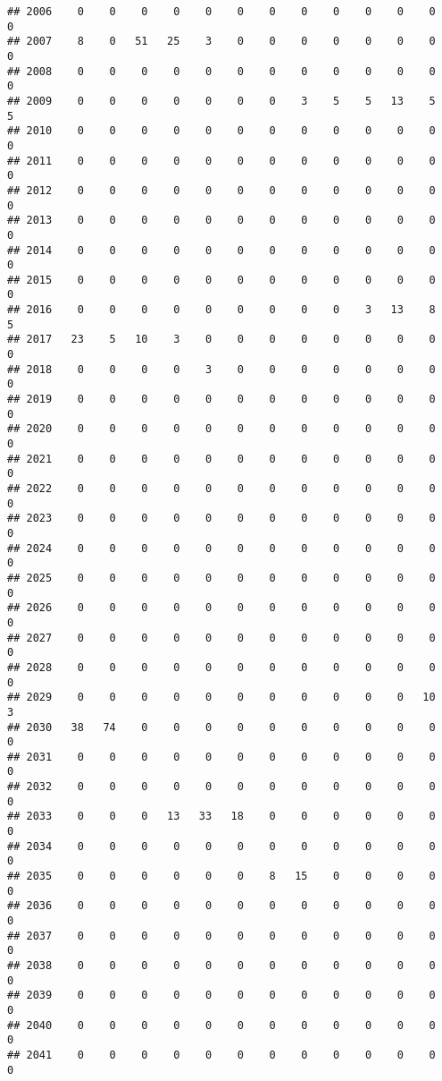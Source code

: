 \documentclass[]{article}
\begin{document}
\begin{verbatim}
## 2006    0    0    0    0    0    0    0    0    0    0    0    0    0
## 2007    8    0   51   25    3    0    0    0    0    0    0    0    0
## 2008    0    0    0    0    0    0    0    0    0    0    0    0    0
## 2009    0    0    0    0    0    0    0    3    5    5   13    5    5
## 2010    0    0    0    0    0    0    0    0    0    0    0    0    0
## 2011    0    0    0    0    0    0    0    0    0    0    0    0    0
## 2012    0    0    0    0    0    0    0    0    0    0    0    0    0
## 2013    0    0    0    0    0    0    0    0    0    0    0    0    0
## 2014    0    0    0    0    0    0    0    0    0    0    0    0    0
## 2015    0    0    0    0    0    0    0    0    0    0    0    0    0
## 2016    0    0    0    0    0    0    0    0    0    3   13    8    5
## 2017   23    5   10    3    0    0    0    0    0    0    0    0    0
## 2018    0    0    0    0    3    0    0    0    0    0    0    0    0
## 2019    0    0    0    0    0    0    0    0    0    0    0    0    0
## 2020    0    0    0    0    0    0    0    0    0    0    0    0    0
## 2021    0    0    0    0    0    0    0    0    0    0    0    0    0
## 2022    0    0    0    0    0    0    0    0    0    0    0    0    0
## 2023    0    0    0    0    0    0    0    0    0    0    0    0    0
## 2024    0    0    0    0    0    0    0    0    0    0    0    0    0
## 2025    0    0    0    0    0    0    0    0    0    0    0    0    0
## 2026    0    0    0    0    0    0    0    0    0    0    0    0    0
## 2027    0    0    0    0    0    0    0    0    0    0    0    0    0
## 2028    0    0    0    0    0    0    0    0    0    0    0    0    0
## 2029    0    0    0    0    0    0    0    0    0    0    0   10    3
## 2030   38   74    0    0    0    0    0    0    0    0    0    0    0
## 2031    0    0    0    0    0    0    0    0    0    0    0    0    0
## 2032    0    0    0    0    0    0    0    0    0    0    0    0    0
## 2033    0    0    0   13   33   18    0    0    0    0    0    0    0
## 2034    0    0    0    0    0    0    0    0    0    0    0    0    0
## 2035    0    0    0    0    0    0    8   15    0    0    0    0    0
## 2036    0    0    0    0    0    0    0    0    0    0    0    0    0
## 2037    0    0    0    0    0    0    0    0    0    0    0    0    0
## 2038    0    0    0    0    0    0    0    0    0    0    0    0    0
## 2039    0    0    0    0    0    0    0    0    0    0    0    0    0
## 2040    0    0    0    0    0    0    0    0    0    0    0    0    0
## 2041    0    0    0    0    0    0    0    0    0    0    0    0    0

\end{verbatim}
\end{document}
